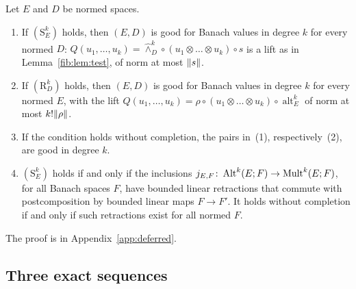 \begin{proposition}[splittings]\label{fib:prop:split}
Let $E$ and $D$ be normed spaces.
\begin{enumerate}
\item If $(\mathrm S^k_E)$ holds, then $(E,D)$ is good for Banach values in degree $k$ for every normed $D$:
$Q(u_1,\dots,u_k)=\widehat\wedge^k_D\circ(u_1\otimes\dots\otimes u_k)\circ s$ is a lift as in
Lemma~\ref{fib:lem:test}, of norm at most $\lVert s\rVert$.
\item If $(\mathrm R^k_D)$ holds, then $(E,D)$ is good for Banach values in degree $k$ for every normed $E$, with the
lift $Q(u_1,\dots,u_k)=\rho\circ(u_1\otimes\dots\otimes u_k)\circ\operatorname{alt}^k_E$ of norm at most $k!\lVert \rho\rVert$.
\item If the condition holds without completion, the pairs in~(1), respectively~(2), are good in degree $k$.
\item $(\mathrm S^k_E)$ holds if and only if the inclusions $j_{E,F}\colon\operatorname{Alt}^k(E;F)\to\operatorname{Mult}^k(E;F)$, for all Banach
spaces $F$, have bounded linear retractions that commute with postcomposition by bounded linear maps $F\to F'$. It
holds without completion if and only if such retractions exist for all normed $F$.
\end{enumerate}
\end{proposition}

The proof is in Appendix~\ref{app:deferred}.

\subsection{Three exact sequences}\label{ob:ssec:sequences}

